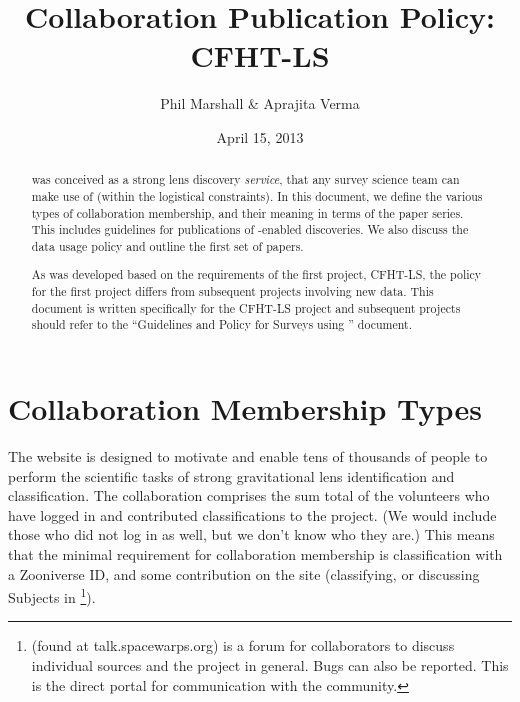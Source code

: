 \documentclass[a4paper]{article}
\begin{document}
             
\title{\SW Collaboration Publication Policy: CFHT-LS}
\author{Phil Marshall \& Aprajita Verma}
\date{April 15, 2013}
\maketitle


\begin{abstract} 
\noindent \sw was conceived as a strong lens
discovery {\it service}, that any survey science team can make use of
(within the logistical constraints). 
In this document, we define 
the various types of \sw
collaboration membership, and their meaning in terms of the \sw
paper series. This includes guidelines for publications of \sw-enabled discoveries. We also discuss the \sw data usage policy and outline the first set of \sw papers.

As \sw was developed based on the requirements of the first \sw project, CFHT-LS, the policy for the first project differs from subsequent \sw projects involving new data. This document is written specifically for the CFHT-LS project and subsequent projects should refer to the ``Guidelines and Policy for Surveys using \sw'' document.
\end{abstract}

\setcounter{footnote}{0}



\section{Collaboration Membership Types}
\label{sec:members}

The \sw website is designed to motivate and  enable tens of thousands of
people to perform the scientific tasks of strong gravitational lens
identification and classification.  The \sw collaboration comprises the
sum total of the volunteers who have logged in and contributed
classifications to the project. (We would include those who did not
log in as well, but we don't know who they are.) This means that the
minimal requirement for \sw collaboration membership is classification with a Zooniverse ID,
and some contribution on the site (\ie classifying, or discussing
Subjects in \Talk \footnote{\Talk (found at talk.spacewarps.org) is a forum for \sw collaborators to discuss individual sources and the \sw project in general. Bugs can also be reported. This is the direct portal for communication with the \sw community.}).
\end{document}

